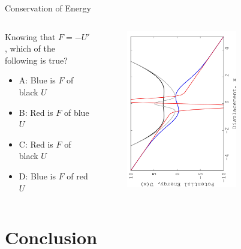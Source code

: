 \documentclass{beamer}
\begin{document}
\begin{frame}{Conservation of Energy}
\begin{columns}[T]
\begin{column}{0.3\textwidth}
\small
Knowing that $F = -U'$, which of the following is true?
\begin{itemize}
\item A: Blue is $F$ of black $U$
\item B: Red is $F$ of blue $U$
\item C: Red is $F$ of black $U$
\item D: Blue is $F$ of red $U$
\end{itemize}
\end{column}
\begin{column}{0.7\textwidth}
\begin{figure}
\centering
\includegraphics[width=0.7\textwidth,angle=270]{figures/Nov14_plot4.jpg}
\end{figure}
\end{column}
\end{columns}
\end{frame}

\section{Conclusion}
\end{document}
